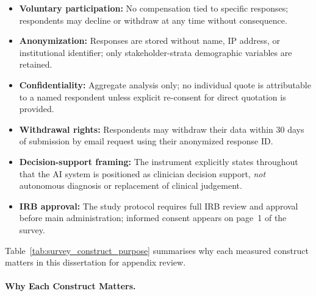 \begin{itemize}[leftmargin=*, itemsep=2pt]
    \item \textbf{Voluntary participation:} No compensation tied to specific responses; respondents may decline or withdraw at any time without consequence.
    \item \textbf{Anonymization:} Responses are stored without name, IP address, or institutional identifier; only stakeholder-strata demographic variables are retained.
    \item \textbf{Confidentiality:} Aggregate analysis only; no individual quote is attributable to a named respondent unless explicit re-consent for direct quotation is provided.
    \item \textbf{Withdrawal rights:} Respondents may withdraw their data within 30 days of submission by email request using their anonymized response ID.
    \item \textbf{Decision-support framing:} The instrument explicitly states throughout that the AI system is positioned as clinician decision support, \emph{not} autonomous diagnosis or replacement of clinical judgement.
    \item \textbf{IRB approval:} The study protocol requires full IRB review and approval before main administration; informed consent appears on page~1 of the survey.
\end{itemize}

\noindent Table~\ref{tab:survey_construct_purpose} summarises why each measured construct matters in this dissertation for appendix review.

\paragraph{Why Each Construct Matters.}




